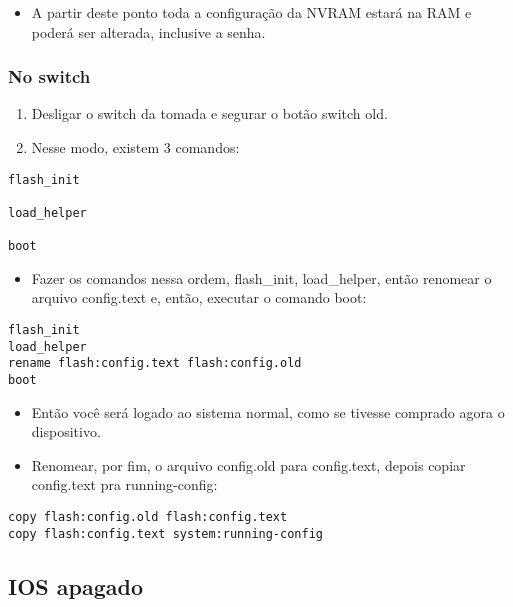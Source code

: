 \documentclass[]{article}
\providecommand{\tightlist}{%
  \setlength{\itemsep}{0pt}\setlength{\parskip}{0pt}}
\begin{document}
\begin{itemize}
\tightlist
\item
  A partir deste ponto toda a configuração da NVRAM estará na RAM e
  poderá ser alterada, inclusive a senha.
\end{itemize}

\hypertarget{no-switch}{%
\subsubsection{No switch}\label{no-switch}}

\begin{enumerate}
\def\labelenumi{\arabic{enumi}.}
\item
  Desligar o switch da tomada e segurar o botão switch old.
\item
  Nesse modo, existem 3 comandos:
\end{enumerate}

\begin{verbatim}
flash_init

load_helper

boot
\end{verbatim}

\begin{itemize}
\tightlist
\item
  Fazer os comandos nessa ordem, flash\_init, load\_helper, então
  renomear o arquivo config.text e, então, executar o comando boot:
\end{itemize}

\begin{verbatim}
flash_init
load_helper
rename flash:config.text flash:config.old
boot
\end{verbatim}

\begin{itemize}
\item
  Então você será logado ao sistema normal, como se tivesse comprado
  agora o dispositivo.
\item
  Renomear, por fim, o arquivo config.old para config.text, depois
  copiar config.text pra running-config:
\end{itemize}

\begin{verbatim}
copy flash:config.old flash:config.text
copy flash:config.text system:running-config
\end{verbatim}

\hypertarget{ios-apagado}{%
\subsection{IOS apagado}\label{ios-apagado}}
\end{document}
